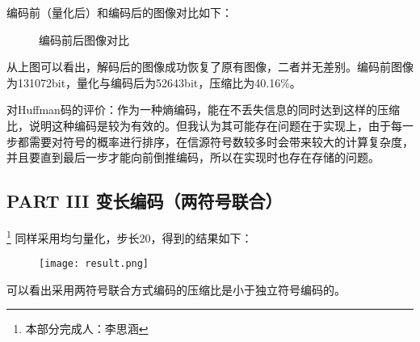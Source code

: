\documentclass[UTF8]{ctexart}
\begin{document}

编码前（量化后）和编码后的图像对比如下：

\begin{figure}[H]
    \centering
    \hspace{\bigskipamount}
    \caption{编码前后图像对比}
\end{figure}

从上图可以看出，解码后的图像成功恢复了原有图像，二者并无差别。编码前图像为131072bit，量化与编码后为52643bit，压缩比为40.16\%。

对Huffman码的评价：作为一种熵编码，能在不丢失信息的同时达到这样的压缩比，说明这种编码是较为有效的。但我认为其可能存在问题在于实现上，由于每一步都需要对符号的概率进行排序，在信源符号数较多时会带来较大的计算复杂度，并且要直到最后一步才能向前倒推编码，所以在实现时也存在存储的问题。


\subsection{PART III 变长编码（两符号联合）}

\footnote{本部分完成人：李思涵} 同样采用均匀量化，步长20，得到的结果如下：
\begin{figure}[H]
    \centering
    \texttt{[image: result.png]}
\end{figure}

可以看出采用两符号联合方式编码的压缩比是小于独立符号编码的。
\end{document}
